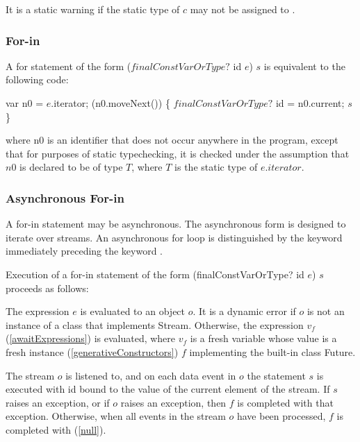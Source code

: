 \documentclass{article}
\newcommand{\code}[1]{{\sf #1}}
\begin{document}
\LMHash{}
It is a static warning if the static type of $c$ may not be assigned to .




\subsubsection{For-in}

\LMHash{}
A for statement of the form \code{ \FOR{} ($finalConstVarOrType?$ id \IN{} $e$) $s$} is equivalent to the following code:

\begin{dartCode}
var n0 = $e$.iterator;
\WHILE{} (n0.moveNext()) \{
   $finalConstVarOrType?$ id = n0.current;
   $s$
\}
\end{dartCode}
where \code{n0} is an identifier that does not occur anywhere in the program, except that for purposes of static typechecking, it is checked under the assumption that $n0$ is declared to be of type $T$, where $T$ is the static type of $e.iterator$.



\subsubsection{Asynchronous For-in}

\LMHash{}
A for-in statement may be asynchronous. The asynchronous form is designed to iterate over streams. An asynchronous for loop is distinguished by the keyword \AWAIT{} immediately preceding the keyword \FOR.

\LMHash{}
Execution of a for-in statement of the form  \code{\AWAIT{} \FOR{} (finalConstVarOrType? id \IN{} $e$) $s$} proceeds as follows:

\LMHash{}
The expression $e$ is evaluated to an object $o$. It is a dynamic error if $o$ is not an instance of a class that implements \code{Stream}. Otherwise, the expression \code{\AWAIT{} $v_f$}  (\ref{awaitExpressions}) is evaluated, where $v_f$ is a fresh variable whose value is a fresh instance (\ref{generativeConstructors}) $f$ implementing the built-in class \code{Future}.

\LMHash{}
The stream $o$ is listened to,  and on each data event in $o$ the statement $s$ is executed with \code{id} bound to the value of the current element of the stream. If $s$ raises an exception, or if $o$ raises an exception, then $f$ is completed with that exception. Otherwise, when all events in the stream $o$ have been processed, $f$ is completed with \NULL{}  (\ref{null}).
\end{document}
